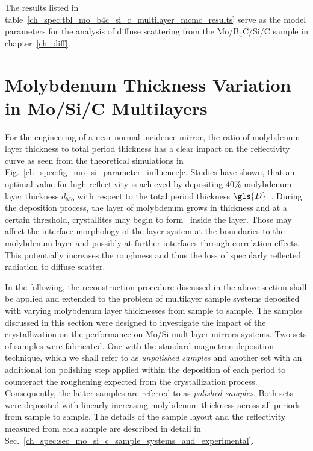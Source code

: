The results listed in table~\ref{ch_spec:tbl_mo_b4c_si_c_multilayer_mcmc_results} serve as the model parameters for the analysis of diffuse scattering from the Mo/B$_4$C/Si/C sample in chapter~\ref{ch_diff}.

\section{Molybdenum Thickness Variation in Mo/Si/C Multilayers} \label{ch_spec:sec_mo_si_c}
For the engineering of a near-normal incidence mirror, the ratio of molybdenum layer thickness to total period thickness has a clear impact on the reflectivity curve as seen from the theoretical simulations in Fig.~\ref{ch_spec:fig_mo_si_parameter_influence}c. Studies have shown, that an optimal value for high reflectivity is achieved by depositing $40\%$ molybdenum layer thickness $d_\text{Mo}$ with respect to the total period thickness $\gls{D}$~\cite{bajt_investigation_2001,braun_mo/si_2002}. During the deposition process, the layer of molybdenum grows in thickness and at a certain threshold, crystallites may begin to form~\cite{verhoeven_ion_1992,bajt_investigation_2001} inside the layer. Those may affect the interface morphology of the layer system at the boundaries to the molybdenum layer and possibly at further interfaces through correlation effects. This potentially increases the roughness and thus the loss of specularly reflected radiation to diffuse scatter.

In the following, the reconstruction procedure discussed in the above section shall be applied and extended to the problem of multilayer sample systems deposited with varying molybdenum layer thicknesses from sample to sample. The samples discussed in this section were designed to investigate the impact of the crystallization on the performance on Mo/Si multilayer mirrors systems. Two sets of samples were fabricated. One with the standard magnetron deposition technique, which we shall refer to as \emph{unpolished samples} and another set with an additional ion polishing step applied within the deposition of each period to counteract the roughening expected from the crystallization process. Consequently, the latter samples are referred to as \emph{polished samples}. Both sets were deposited with linearly increasing molybdenum thickness across all periods from sample to sample. The details of the sample layout and the reflectivity measured from each sample are described in detail in Sec.~\ref{ch_spec:sec_mo_si_c_sample_systems_and_experimental}. 

